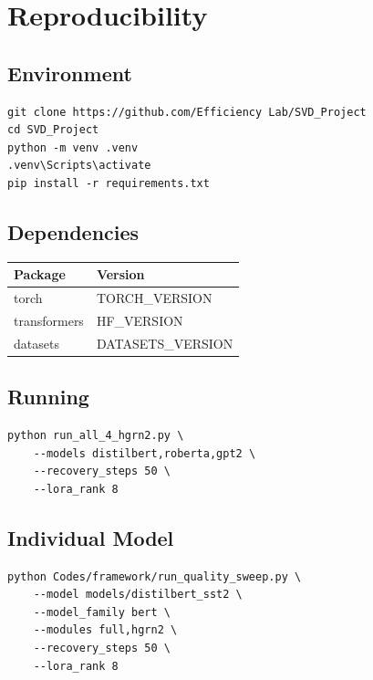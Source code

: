 \section{Reproducibility}

\subsection{Environment}

\begin{lstlisting}
git clone https://github.com/Efficiency Lab/SVD_Project
cd SVD_Project
python -m venv .venv
.venv\Scripts\activate
pip install -r requirements.txt
\end{lstlisting}

\subsection{Dependencies}

\begin{table}[H]
\centering
\small
\begin{tabular}{ll}
\toprule
\textbf{Package} & \textbf{Version} \\
\midrule
torch & {{TORCH\_VERSION}} \\
transformers & {{HF\_VERSION}} \\
datasets & {{DATASETS\_VERSION}} \\
\bottomrule
\end{tabular}
\end{table}

\subsection{Running}

\begin{lstlisting}
python run_all_4_hgrn2.py \
    --models distilbert,roberta,gpt2 \
    --recovery_steps 50 \
    --lora_rank 8
\end{lstlisting}

\subsection{Individual Model}

\begin{lstlisting}
python Codes/framework/run_quality_sweep.py \
    --model models/distilbert_sst2 \
    --model_family bert \
    --modules full,hgrn2 \
    --recovery_steps 50 \
    --lora_rank 8
\end{lstlisting}

